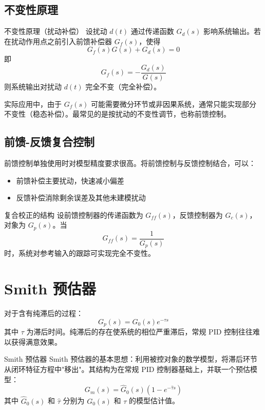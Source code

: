 \subsection{不变性原理}

\begin{myTheorem}{不变性原理（扰动补偿）}
设扰动 $d(t)$ 通过传递函数 $G_d(s)$ 影响系统输出。若在扰动作用点之前引入前馈补偿器 $G_f(s)$，使得
\[
G_f(s)G(s) + G_d(s) = 0
\]
即
\[
G_f(s) = -\frac{G_d(s)}{G(s)}
\]
则系统输出对扰动 $d(t)$ 完全不变（完全补偿）。
\end{myTheorem}

实际应用中，由于 $G_f(s)$ 可能需要微分环节或非因果系统，通常只能实现部分不变性（稳态补偿）。最常见的是按扰动的不变性调节，也称前馈控制。

\subsection{前馈-反馈复合控制}

前馈控制单独使用时对模型精度要求很高。将前馈控制与反馈控制结合，可以：
\begin{itemize}
    \item 前馈补偿主要扰动，快速减小偏差
    \item 反馈补偿消除剩余误差及其他未建模扰动
\end{itemize}

\begin{mydefinition}{复合校正的结构}
设前馈控制器的传递函数为 $G_{ff}(s)$，反馈控制器为 $G_c(s)$，对象为 $G_p(s)$。当
\[
G_{ff}(s) = \frac{1}{G_p(s)}
\]
时，系统对参考输入的跟踪可实现完全不变性。
\end{mydefinition}

\section{Smith 预估器}

对于含有纯滞后的过程：
\[
G_p(s) = G_0(s) e^{-\tau s}
\]
其中 $\tau$ 为滞后时间。纯滞后的存在使系统的相位严重滞后，常规 PID 控制往往难以获得满意效果。

\begin{mydefinition}{Smith 预估器}
Smith 预估器的基本思想：利用被控对象的数学模型，将滞后环节从闭环特征方程中"移出"。其结构为在常规 PID 控制器基础上，并联一个预估模型：
\[
G_m(s) = \hat{G}_0(s)(1 - e^{-\hat{\tau} s})
\]
其中 $\hat{G}_0(s)$ 和 $\hat{\tau}$ 分别为 $G_0(s)$ 和 $\tau$ 的模型估计值。
\end{mydefinition}

